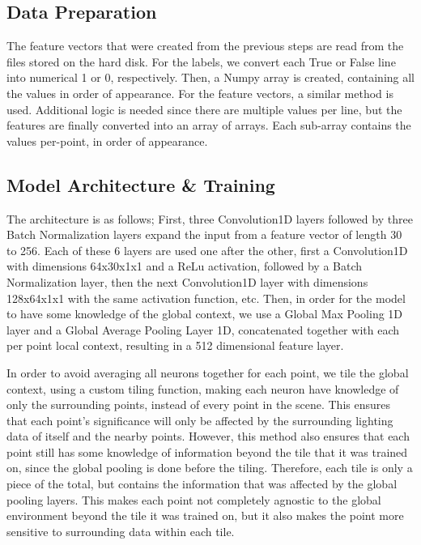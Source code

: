 \subsection{Data Preparation}
The feature vectors that were created from the previous steps are read from the files stored on the hard disk. For the labels, we convert each True or False line into numerical 1 or 0, respectively. Then, a Numpy array is created, containing all the values in order of appearance.
For the feature vectors, a similar method is used. Additional logic is needed since there are multiple values per line, but the features are finally converted into an array of arrays. Each sub-array contains the values per-point, in order of appearance.

\subsection{Model Architecture \& Training}

The architecture is as follows; First, three Convolution1D layers followed by three Batch Normalization layers expand the input from a feature vector of length 30 to 256. Each of these 6 layers are used one after the other, first a Convolution1D with dimensions 64x30x1x1 and a ReLu activation, followed by a Batch Normalization layer, then the next Convolution1D layer with dimensions 128x64x1x1 with the same activation function, etc. Then, in order for the model to have some knowledge of the global context, we use a Global Max Pooling 1D layer and a Global Average Pooling Layer 1D, concatenated together with each per point local context, resulting in a 512 dimensional feature layer. 

In order to avoid averaging all neurons together for each point, we tile the global context, using a custom tiling function, making each neuron have knowledge of only the surrounding points, instead of every point in the scene. This ensures that each point's significance will only be affected by the surrounding lighting data of itself and the nearby points. However, this method also ensures that each point still has some knowledge of information beyond the tile that it was trained on, since the global pooling is done before the tiling. Therefore, each tile is only a piece of the total, but contains the information that was affected by the global pooling layers. This makes each point not completely agnostic to the global environment beyond the tile it was trained on, but it also makes the point more sensitive to surrounding data within each tile.

